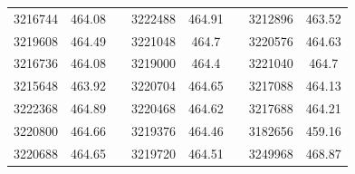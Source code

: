 \documentclass[12pt]{mwart}
\begin{document}
\begin{table}[H]
\begin{tabular}{cclcclcc}
		3216744                                                  & 464.08                                                        &  & 3222488                                                  & 464.91                                                        &  & 3212896                                                  & 463.52                                                        \\
		3219608                                                  & 464.49                                                        &  & 3221048                                                  & 464.7                                                         &  & 3220576                                                  & 464.63                                                        \\
		3216736                                                  & 464.08                                                        &  & 3219000                                                  & 464.4                                                         &  & 3221040                                                  & 464.7                                                         \\
		3215648                                                  & 463.92                                                        &  & 3220704                                                  & 464.65                                                        &  & 3217088                                                  & 464.13                                                        \\
		3222368                                                  & 464.89                                                        &  & 3220468                                                  & 464.62                                                        &  & 3217688                                                  & 464.21                                                        \\
		3220800                                                  & 464.66                                                        &  & 3219376                                                  & 464.46                                                        &  & 3182656                                                  & 459.16                                                        \\
		3220688                                                  & 464.65                                                        &  & 3219720                                                  & 464.51                                                        &  & 3249968                                                  & 468.87                                                        \\

\end{tabular}
\end{table}
\end{document}
